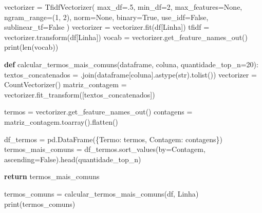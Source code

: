 \documentclass[
  brazilian,
  letterpaper,
  DIV=11,
  numbers=noendperiod]{scrartcl}
\newenvironment{Shaded}{\begin{snugshade}}{\end{snugshade}}
\newcommand{\BuiltInTok}[1]{\textcolor[rgb]{0.00,0.23,0.31}{#1}}
\newcommand{\ControlFlowTok}[1]{\textcolor[rgb]{0.00,0.23,0.31}{\textbf{#1}}}
\newcommand{\DecValTok}[1]{\textcolor[rgb]{0.68,0.00,0.00}{#1}}
\newcommand{\FloatTok}[1]{\textcolor[rgb]{0.68,0.00,0.00}{#1}}
\newcommand{\KeywordTok}[1]{\textcolor[rgb]{0.00,0.23,0.31}{\textbf{#1}}}
\newcommand{\NormalTok}[1]{\textcolor[rgb]{0.00,0.23,0.31}{#1}}
\newcommand{\OperatorTok}[1]{\textcolor[rgb]{0.37,0.37,0.37}{#1}}
\newcommand{\StringTok}[1]{\textcolor[rgb]{0.13,0.47,0.30}{#1}}
\newcommand{\VariableTok}[1]{\textcolor[rgb]{0.07,0.07,0.07}{#1}}
\begin{document}
\begin{Shaded}
\begin{Highlighting}[]
\NormalTok{vectorizer }\OperatorTok{=}\NormalTok{ TfidfVectorizer(}
\NormalTok{    max\_df}\OperatorTok{=}\FloatTok{.5}\NormalTok{,}
\NormalTok{    min\_df}\OperatorTok{=}\DecValTok{2}\NormalTok{,}
\NormalTok{    max\_features}\OperatorTok{=}\VariableTok{None}\NormalTok{,}
\NormalTok{    ngram\_range}\OperatorTok{=}\NormalTok{(}\DecValTok{1}\NormalTok{, }\DecValTok{2}\NormalTok{),}
\NormalTok{    norm}\OperatorTok{=}\VariableTok{None}\NormalTok{,}
\NormalTok{    binary}\OperatorTok{=}\VariableTok{True}\NormalTok{,}
\NormalTok{    use\_idf}\OperatorTok{=}\VariableTok{False}\NormalTok{,}
\NormalTok{    sublinear\_tf}\OperatorTok{=}\VariableTok{False}
\NormalTok{)}
\NormalTok{vectorizer }\OperatorTok{=}\NormalTok{ vectorizer.fit(df[}\StringTok{\textquotesingle{}Linha\textquotesingle{}}\NormalTok{])}
\NormalTok{tfidf }\OperatorTok{=}\NormalTok{ vectorizer.transform(df[}\StringTok{\textquotesingle{}Linha\textquotesingle{}}\NormalTok{])}
\NormalTok{vocab }\OperatorTok{=}\NormalTok{ vectorizer.get\_feature\_names\_out()}
\BuiltInTok{print}\NormalTok{(}\BuiltInTok{len}\NormalTok{(vocab))}

\KeywordTok{def}\NormalTok{ calcular\_termos\_mais\_comuns(dataframe, coluna, quantidade\_top\_n}\OperatorTok{=}\DecValTok{20}\NormalTok{):}
\NormalTok{    textos\_concatenados }\OperatorTok{=} \StringTok{\textquotesingle{} \textquotesingle{}}\NormalTok{.join(dataframe[coluna].astype(}\BuiltInTok{str}\NormalTok{).tolist())}
\NormalTok{    vectorizer }\OperatorTok{=}\NormalTok{ CountVectorizer()}
\NormalTok{    matriz\_contagem }\OperatorTok{=}\NormalTok{ vectorizer.fit\_transform([textos\_concatenados])}

\NormalTok{    termos }\OperatorTok{=}\NormalTok{ vectorizer.get\_feature\_names\_out()}
\NormalTok{    contagens }\OperatorTok{=}\NormalTok{ matriz\_contagem.toarray().flatten()}

\NormalTok{    df\_termos }\OperatorTok{=}\NormalTok{ pd.DataFrame(\{}\StringTok{\textquotesingle{}Termo\textquotesingle{}}\NormalTok{: termos, }\StringTok{\textquotesingle{}Contagem\textquotesingle{}}\NormalTok{: contagens\})}
\NormalTok{    termos\_mais\_comuns }\OperatorTok{=}\NormalTok{ df\_termos.sort\_values(by}\OperatorTok{=}\StringTok{\textquotesingle{}Contagem\textquotesingle{}}\NormalTok{, ascending}\OperatorTok{=}\VariableTok{False}\NormalTok{).head(quantidade\_top\_n)}

    \ControlFlowTok{return}\NormalTok{ termos\_mais\_comuns}


\NormalTok{termos\_comuns }\OperatorTok{=}\NormalTok{ calcular\_termos\_mais\_comuns(df, }\StringTok{\textquotesingle{}Linha\textquotesingle{}}\NormalTok{)}
\BuiltInTok{print}\NormalTok{(termos\_comuns)}


\end{Highlighting}
\end{Shaded}
\end{document}
